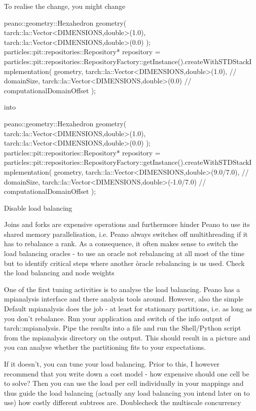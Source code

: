 To realise the change, you might change

peano::geometry::Hexahedron geometry(
  tarch::la::Vector<DIMENSIONS,double>(1.0),
  tarch::la::Vector<DIMENSIONS,double>(0.0)
 );
particles::pit::repositories::Repository* repository = 
    particles::pit::repositories::RepositoryFactory::getInstance().createWithSTDStackImplementation(
    geometry,
    tarch::la::Vector<DIMENSIONS,double>(1.0),   // domainSize,
    tarch::la::Vector<DIMENSIONS,double>(0.0)    // computationalDomainOffset
  );

into

peano::geometry::Hexahedron geometry(
  tarch::la::Vector<DIMENSIONS,double>(1.0),
  tarch::la::Vector<DIMENSIONS,double>(0.0)
 );
particles::pit::repositories::Repository* repository = 
    particles::pit::repositories::RepositoryFactory::getInstance().createWithSTDStackImplementation(
    geometry,
    tarch::la::Vector<DIMENSIONS,double>(9.0/7.0),   // domainSize,
    tarch::la::Vector<DIMENSIONS,double>(-1.0/7.0)    // computationalDomainOffset
  );

Disable load balancing

Joins and forks are expensive operations and furthermore hinder Peano to use its shared memory parallelisation, i.e. Peano always switches off multithreading if it has to rebalance a rank. As a consequence, it often makes sense to switch the load balancing oracles - to use an oracle not rebalancing at all most of the time but to identify critical steps where another òracle rebalancing is us used.
Check the load balancing and node weights

One of the first tuning activities is to analyse the load balancing. Peano has a mpianalysis interface and there analysis tools around. However, also the simple Default mpianalysis does the job - at least for stationary partitions, i.e. as long as you don't rebalance. Run your application and switch of the info output of tarch::mpianalysis. Pipe the results into a file and run the Shell/Python script from the mpianalysis directory on the output. This should result in a picture and you can analyse whether the partitioning fits to your expectations.

If it doesn't, you can tune your load balancing. Prior to this, I however recommend that you write down a cost model - how expensive should one cell be to solve? Then you can use the load per cell individually in your mappings and thus guide the load balancing (actually any load balancing you intend later on to use) how costly different subtrees are.
Doublecheck the multiscale concurrency


